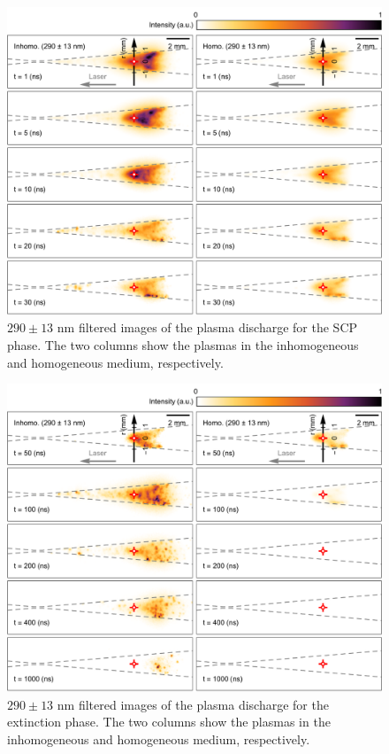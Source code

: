 \begin{figure}[ht!]
\centering
\includegraphics[width=130mm]{figures/ch4/imaging/290SCP.pdf}
\caption{$290\pm13 \text{ nm}$ filtered images of the plasma discharge for the SCP phase. The two columns show the plasmas in the inhomogeneous and homogeneous medium, respectively.}
\label{fig:290SCP}
\end{figure}

\begin{figure}[ht!]
\centering
\includegraphics[width=130mm]{figures/ch4/imaging/290ext.pdf}
\caption{$290\pm13 \text{ nm}$ filtered images of the plasma discharge for the extinction phase. The two columns show the plasmas in the inhomogeneous and homogeneous medium, respectively.}
\label{fig:290ext0ext}
\end{figure}

